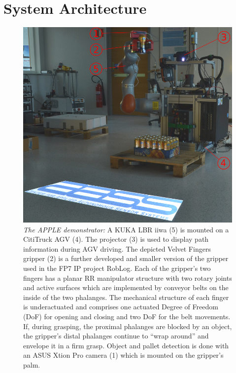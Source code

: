 \section{System Architecture}
\label{sec:arch}
%
%
\begin{figure}[t!]
\begin{center}
\includegraphics[width =1\linewidth]{figs/apple_demonstrator}
\caption{\textit{The APPLE demonstrator:} A KUKA LBR iiwa (5) is mounted on a CitiTruck AGV (4). The
  projector (3) is used to display path information during AGV driving. The depicted Velvet Fingers
  gripper (2) is a further developed and smaller version of the gripper used in the FP7 IP project
  RobLog. Each of the gripper’s two fingers has a planar RR manipulator structure with two rotary
  joints and active surfaces which are implemented by conveyor belts on the inside of the two
  phalanges. The mechanical structure of each finger is underactuated and comprises one actuated
  Degree of Freedom (DoF) for opening and closing and two DoF for the belt movements. If, during
  grasping, the proximal phalanges are blocked by an object, the gripper’s distal phalanges continue
  to “wrap around” and envelope it in a firm grasp. Object and pallet detection is done with
  an ASUS Xtion Pro camera (1) which is mounted on the gripper's palm.}
\label{fig:robot}
\end{center}
\end{figure}
%
